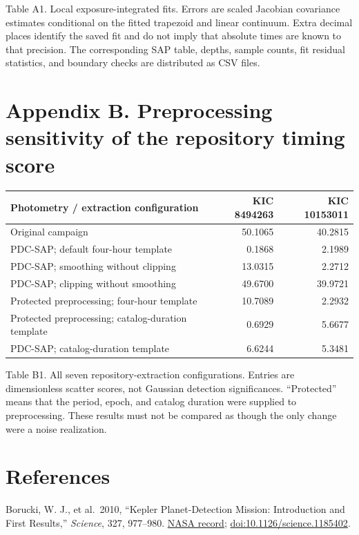 \documentclass[
  english,
]{article}
\begin{document}
Table A1. Local exposure-integrated fits. Errors are scaled Jacobian
covariance estimates conditional on the fitted trapezoid and linear
continuum. Extra decimal places identify the saved fit and do not imply
that absolute times are known to that precision. The corresponding SAP
table, depths, sample counts, fit residual statistics, and boundary
checks are distributed as CSV files.

\section{Appendix B. Preprocessing sensitivity of the repository timing
score}\label{appendix-b.-preprocessing-sensitivity-of-the-repository-timing-score}

\begin{longtable}[]{@{}lrr@{}}
\toprule\noalign{}
Photometry / extraction configuration & KIC 8494263 & KIC 10153011 \\
\midrule\noalign{}
\endhead
\bottomrule\noalign{}
\endlastfoot
Original campaign & 50.1065 & 40.2815 \\
PDC-SAP; default four-hour template & 0.1868 & 2.1989 \\
PDC-SAP; smoothing without clipping & 13.0315 & 2.2712 \\
PDC-SAP; clipping without smoothing & 49.6700 & 39.9721 \\
Protected preprocessing; four-hour template & 10.7089 & 2.2932 \\
Protected preprocessing; catalog-duration template & 0.6929 & 5.6677 \\
PDC-SAP; catalog-duration template & 6.6244 & 5.3481 \\
\end{longtable}

Table B1. All seven repository-extraction configurations. Entries are
dimensionless scatter scores, not Gaussian detection significances.
``Protected'' means that the period, epoch, and catalog duration were
supplied to preprocessing. These results must not be compared as though
the only change were a noise realization.

\section{References}\label{references}

Borucki, W. J., et al.~2010, ``Kepler Planet-Detection Mission:
Introduction and First Results,'' \emph{Science}, 327, 977--980.
\href{https://ntrs.nasa.gov/citations/20100030619}{NASA record};
\href{https://doi.org/10.1126/science.1185402}{doi:10.1126/science.1185402}.
\end{document}
